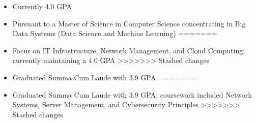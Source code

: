\begin{itemize}
<<<<<<< Updated upstream
  \item Currently 4.0 GPA
  \item Pursuant to a Master of Science in Computer Science concentrating in Big Data Systems (Data Science and Machine Learning)
=======
  \item Focus on IT Infrastructure, Network Management, and Cloud Computing; currently maintaining a 4.0 GPA
>>>>>>> Stashed changes
\end{itemize}
\divider

\begin{itemize}
<<<<<<< Updated upstream
  \item Graduated Summa Cum Laude with 3.9 GPA
=======
  \item Graduated Summa Cum Laude with 3.9 GPA; coursework included Network Systems, Server Management, and Cybersecurity Principles
>>>>>>> Stashed changes
\end{itemize}

